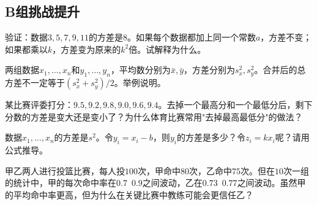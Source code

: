 \subsection*{B组\quad 挑战提升}

\begin{exercise}
\item 验证：数据$3,5,7,9,11$的方差是$8$。如果每个数据都加上同一个常数$a$，方差不变；如果都乘以$k$，方差变为原来的$k^2$倍。试解释为什么。
\item 两组数据$x_1,\dots,x_n$和$y_1,\dots,y_n$，平均数分别为$\bar x,\bar y$，方差分别为$s_x^2,s_y^2$。合并后的总方差不一定等于$(s_x^2+s_y^2)/2$。举例说明。
\item 某比赛评委打分：$9.5,9.2,9.8,9.0,9.6,9.4$。去掉一个最高分和一个最低分后，剩下分数的方差是变大还是变小了？为什么体育比赛常用"去掉最高最低分"的做法？
\item 数据$x_1,\dots,x_n$的方差是$s^2$。令$y_i=x_i-b$，则$y_i$的方差是多少？令$z_i=kx_i$呢？请用公式推导。
\item 甲乙两人进行投篮比赛，每人投$100$次，甲命中$80$次，乙命中$75$次。但在$10$次一组的统计中，甲的每次命中率在$0.7$~$0.9$之间波动，乙在$0.73$~$0.77$之间波动。虽然甲的平均命中率更高，但为什么在关键比赛中教练可能会更信任乙？
\end{exercise}

\newpage
